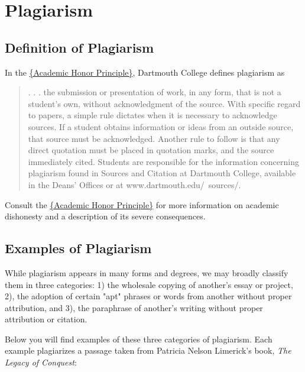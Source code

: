 

\chapter{Plagiarism}

\section{Definition of Plagiarism}

In the \href{http://www.bu.edu/academics/resources/academic-conduct-code}{\{Academic Honor Principle\}}, Dartmouth College defines plagiarism as

\begin{quote}. . . the submission or presentation of work, in any form, that is not a student's own, without acknowledgment of the source. With specific regard to papers, a simple rule dictates when it is necessary to acknowledge sources. If a student obtains information or ideas from an outside source, that source must be acknowledged. Another rule to follow is that any direct quotation must be placed in quotation marks, and the source immediately cited. Students are responsible for the information concerning plagiarism found in Sources and Citation at Dartmouth College, available in the Deans' Offices or at www.dartmouth.edu/~sources/.
\end{quote}

Consult the \href{http://www.dartmouth.edu/~uja/honor/}{\{Academic Honor Principle\}} 
for more information on academic dishonesty and a description of its severe consequences.

\section{Examples of Plagiarism}

While plagiarism appears in many forms and degrees, we may broadly classify them in three categories: 1) the wholesale copying of another's essay or project, 2), the adoption of certain "apt" phrases or words from another without proper attribution, 
and 3), the paraphrase of another's writing without proper attribution or citation. 

Below you will find examples of these three categories of plagiarism. Each example plagiarizes a passage
taken from Patricia Nelson Limerick's book, \emph{The Legacy of Conquest}:

